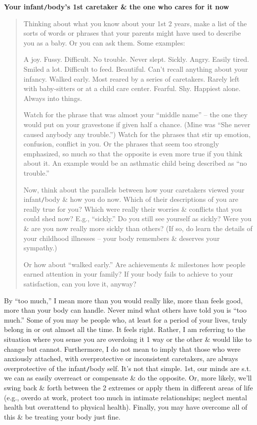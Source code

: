 \documentclass{article}
\numberwithin{equation}{section}
\begin{document}
\textbf{Your infant{\tt/}body's 1st caretaker \& the one who cares for it now}
\begin{quotation}
	Thinking about what you know about your 1st 2 years, make a list of the sorts of words or phrases that your parents might have used to describe you as a baby. Or you can ask them. Some examples:

	A joy. Fussy. Difficult. No trouble. Never slept. Sickly. Angry. Easily tired. Smiled a lot. Difficult to feed. Beautiful. Can't recall anything about your infancy. Walked early. Most reared by a series of caretakers. Rarely left with baby-sitters or at a child care center. Fearful. Shy. Happiest alone. Always into things.
	
	Watch for the phrase that was almost your ``middle name'' -- the one they would put on your gravestone if given half a chance. (Mine was ``She never caused anybody any trouble.'') Watch for the phrases that stir up emotion, confusion, conflict in you. Or the phrases that seem too strongly emphasized, so much so that the opposite is even more true if you think about it. An example would be an asthmatic child being described as ``no trouble.''
	
	Now, think about the parallels between how your caretakers viewed your infant{\tt/}body \& how you do now. Which of their descriptions of you are really true for you? Which were really their worries \& conflicts that you could shed now? E.g., ``sickly.'' Do you still see yourself as sickly? Were you \& are you now really more sickly than others? (If so, do learn the details of your childhood illnesses -- your body remembers \& deserves your sympathy.)
	
	Or how about ``walked early.'' Are achievements \& milestones how people earned attention in your family? If your body fails to achieve to your satisfaction, can you love it, anyway?
\end{quotation}
By ``too much,'' I mean more than you would really like, more than feels good, more than your body can handle. Never mind what others have told you is ``too much.'' Some of you may be people who, at least for a period of your lives, truly belong in or out almost all the time. It feels right. Rather, I am referring to the situation where you sense you are overdoing it 1 way or the other \& would like to change but cannot. Furthermore, I do not mean to imply that those who were anxiously attached, with overprotective or inconsistent caretakers, are always overprotective of the infant{\tt/}body self. It's not that simple. 1st, our minds are s.t. we can as easily overreact or compensate \& do the opposite. Or, more likely, we'll swing back \& forth between the 2 extremes or apply them in different areas of life (e.g., overdo at work, protect too much in intimate relationships; neglect mental health but overattend to physical health). Finally, you may have overcome all of this \& be treating your body just fine.
\end{document}
